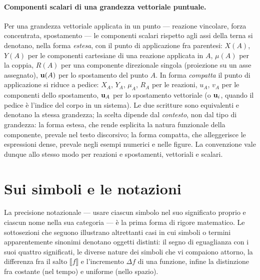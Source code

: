 \paragraph{Componenti scalari di una grandezza vettoriale puntuale.}
Per una grandezza vettoriale applicata in un punto --- reazione
vincolare, forza concentrata, spostamento --- le componenti scalari
rispetto agli assi della terna si denotano, nella forma \emph{estesa},
con il punto di applicazione fra parentesi: $X(A)$, $Y(A)$ per le
componenti cartesiane di una reazione applicata in $A$, $\mu(A)$ per la
coppia, $R(A)$ per una componente direzionale singola (proiezione su un
asse assegnato), $\mathbf{u}(A)$ per lo spostamento del punto $A$. In forma
\emph{compatta} il punto di applicazione si riduce a pedice: $X_A$,
$Y_A$, $\mu_A$, $R_A$ per le reazioni, $u_A$, $v_A$ per le componenti
dello spostamento, $\mathbf{u}_A$ per lo spostamento vettoriale (o $\mathbf{u}_i$,
quando il pedice è l'indice del corpo in un sistema). Le due scritture
sono equivalenti e denotano la stessa grandezza; la scelta dipende dal
\emph{contesto}, non dal tipo di grandezza: la forma estesa, che rende
esplicita la natura funzionale della componente, prevale nel testo
discorsivo; la forma compatta, che alleggerisce le espressioni dense,
prevale negli esempi numerici e nelle figure. La convenzione vale
dunque allo stesso modo per reazioni e spostamenti, vettoriali e
scalari.



\section{Sui simboli e le notazioni}\label{sec:simboli}

La precisione notazionale --- usare ciascun simbolo nel suo 
significato proprio e ciascun nome nella sua categoria --- è la 
prima forma di rigore matematico. Le sottosezioni che seguono 
illustrano altrettanti casi in cui simboli o termini apparentemente 
sinonimi denotano oggetti distinti: il segno di eguaglianza con i 
suoi quattro significati, le diverse nature dei simboli che vi 
compaiono attorno, la differenza fra il salto $\llbracket f 
\rrbracket$ e l'incremento $\Delta f$ di una funzione, infine la 
distinzione fra costante (nel tempo) e uniforme (nello spazio).


